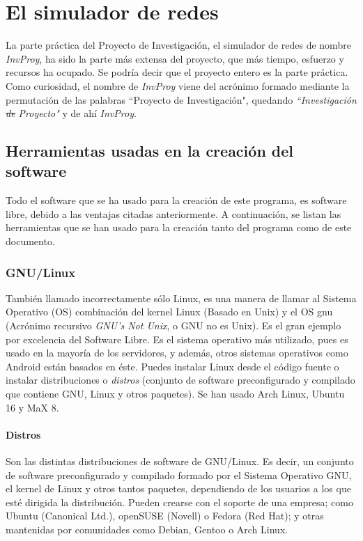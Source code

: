 \documentclass[a4paper, 11pt]{report} %
\begin{document}
\newcommand{\function}[1]{\texttt{\color{Orange}#1}}
\newcommand{\class}[1]{\texttt{\color{DarkRed}#1}}
\chapter{El simulador de redes}
La parte práctica del Proyecto de Investigación, el simulador de redes de nombre \textit{InvProy}, ha sido la parte más extensa del proyecto, que más tiempo, esfuerzo y recursos ha ocupado. Se podría decir que el proyecto entero es la parte práctica. Como curiosidad, el nombre de \textit{InvProy} viene del acrónimo formado mediante la permutación de las palabras ``Proyecto de Investigación", quedando \textit{``Investigación \sout{de} Proyecto"} y de ahí \textit{InvProy}.

\section{Herramientas usadas en la creación del software}
Todo el software que se ha usado para la creación de este programa, es software libre, debido a las ventajas citadas anteriormente. A continuación, se listan las herramientas que se han usado para la creación tanto del programa como de este documento.

\subsection{GNU/Linux}
También llamado incorrectamente sólo Linux, es una manera de llamar al Sistema Operativo (OS) combinación del kernel Linux (Basado en Unix) y el OS \acrshort{gnu} (Acrónimo recursivo \textit{GNU's Not Unix}, o GNU no es Unix). Es el gran ejemplo por excelencia del Software Libre. Es el sistema operativo más utilizado, pues es usado en la mayoría de los servidores, y además, otros sistemas operativos como Android están basados en éste. Puedes instalar Linux desde el código fuente o instalar distribuciones o \textit{distros} (conjunto de software preconfigurado y compilado que contiene GNU, Linux y otros paquetes). Se han usado Arch Linux, Ubuntu 16 y MaX 8.

\subsubsection{Distros}
Son las distintas distribuciones de software de GNU/Linux. Es decir, un conjunto de software preconfigurado y compilado formado por el Sistema Operativo GNU, el kernel de Linux y otros tantos paquetes, dependiendo de los usuarios a los que esté dirigida la distribución. Pueden crearse con el soporte de una empresa; como Ubuntu (Canonical Ltd.), openSUSE (Novell) o Fedora (Red Hat); y otras mantenidas por comunidades como Debian, Gentoo o Arch Linux.
\end{document}
